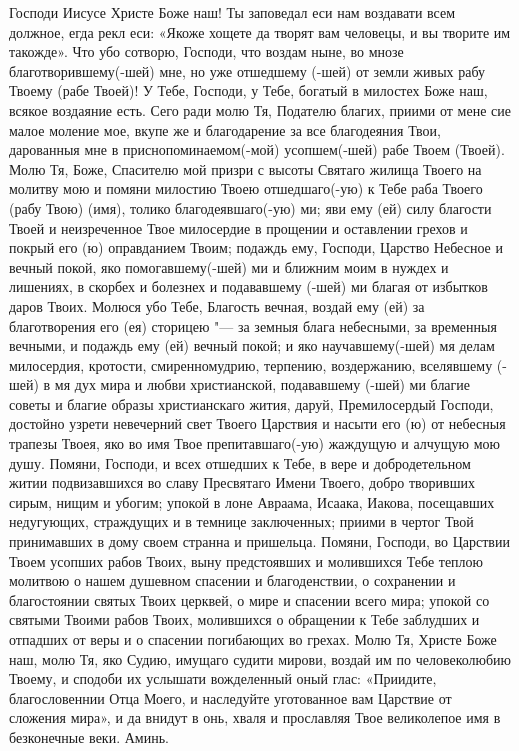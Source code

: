 Господи Иисусе Христе Боже наш! Ты заповедал еси нам воздавати всем должное, егда рекл еси: «Якоже хощете да творят вам человецы, и вы творите им такожде». Что убо сотворю, Господи, что воздам ныне, во мнозе благотворившему(-шей) мне, но уже отшедшему (-шей) от земли живых рабу Твоему (рабе Твоей)! У Тебе, Господи, у Тебе, богатый в милостех Боже наш, всякое воздаяние есть. Сего ради молю Тя, Подателю благих, приими от мене сие малое моление мое, вкупе же и благодарение за все благодеяния Твои, дарованныя мне в приснопоминаемом(-мой) усопшем(-шей) рабе Твоем (Твоей). Молю Тя, Боже, Спасителю мой призри с высоты Святаго жилища Твоего на молитву мою и помяни милостию Твоею отшедшаго(-ую) к Тебе раба Твоего (рабу Твою) (имя), толико благодеявшаго(-ую) ми; яви ему (ей) силу благости Твоей и неизреченное Твое милосердие в прощении и оставлении грехов и покрый его (ю) оправданием Твоим; подаждь ему, Господи, Царство Небесное и вечный покой, яко помогавшему(-шей) ми и ближним моим в нуждех и лишениях, в скорбех и болезнех и подававшему (-шей) ми благая от избытков даров Твоих. Молюся убо Тебе, Благость вечная, воздай ему (ей) за благотворения его (ея) сторицею "--- за земныя блага небесными, за временныя вечными, и подаждь ему (ей) вечный покой; и яко научавшему(-шей) мя делам милосердия, кротости, смиренномудрию, терпению, воздержанию, вселявшему (-шей) в мя дух мира и любви христианской, подававшему (-шей) ми благие советы и благие образы христианскаго жития, даруй, Премилосердый Господи, достойно узрети невечерний свет Твоего Царствия и насыти его (ю) от небесныя трапезы Твоея, яко во имя Твое препитавшаго(-ую) жаждущую и алчущую мою душу. Помяни, Господи, и всех отшедших к Тебе, в вере и добродетельном житии подвизавшихся во славу Пресвятаго Имени Твоего, добро творивших сирым, нищим и убогим; упокой в лоне Авраама, Исаака, Иакова, посещавших недугующих, страждущих и в темнице заключенных; приими в чертог Твой принимавших в дому своем странна и пришельца. Помяни, Господи, во Царствии Твоем усопших рабов Твоих, выну предстоявших и молившихся Тебе теплою молитвою о нашем душевном спасении и благоденствии, о сохранении и благостоянии святых Твоих церквей, о мире и спасении всего мира; упокой со святыми Твоими рабов Твоих, молившихся о обращении к Тебе заблудших и отпадших от веры и о спасении погибающих во грехах. Молю Тя, Христе Боже наш, молю Тя, яко Судию, имущаго судити мирови, воздай им по человеколюбию Твоему, и сподоби их услышати вожделенный оный глас: «Приидите, благословеннии Отца Моего, и наследуйте уготованное вам Царствие от сложения мира», и да внидут в онь, хваля и прославляя Твое великолепое имя в безконечные веки. Аминь. 
\mychapterending

